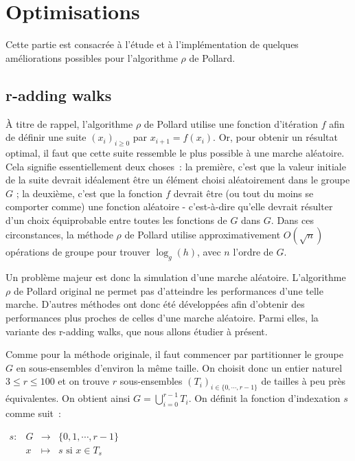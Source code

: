 \chapter{Optimisations}
	Cette partie est consacrée à l'étude et à l'implémentation de quelques améliorations possibles pour l'algorithme $\rho$ de Pollard.

		\section{r-adding walks}
    À titre de rappel, l'algorithme $\rho$ de Pollard utilise une fonction d'itération $f$ afin de définir une suite $(x_i)_{i \ge 0}$ par $x_{i+1} = f(x_i)$. Or, pour obtenir un résultat optimal, il faut que cette suite ressemble le plus possible à une marche aléatoire. Cela signifie essentiellement deux choses~: la première, c'est que la valeur initiale de la suite devrait idéalement être un élément choisi aléatoirement dans le groupe $G$ ; la deuxième, c'est que la fonction $f$ devrait être (ou tout du moins se comporter comme) une fonction aléatoire - c'est-à-dire qu'elle devrait résulter d'un choix équiprobable entre toutes les fonctions de $G$ dans $G$. Dans ces circonstances, la méthode $\rho$ de Pollard utilise approximativement $O(\sqrt{n})$ opérations de groupe pour trouver $\log_g(h)$, avec $n$ l'ordre de $G$.

		Un problème majeur est donc la simulation d'une marche aléatoire. L'algorithme $\rho$ de Pollard original ne permet pas d'atteindre les performances d'une telle marche. D'autres méthodes ont donc été développées afin d'obtenir des performances plus proches de celles d'une marche aléatoire. Parmi elles, la variante des r-adding walks, que nous allons étudier à présent.

		Comme pour la méthode originale, il faut commencer par partitionner le groupe $G$ en sous-ensembles d'environ la même taille. On choisit donc un entier naturel $3 \leq r \leq 100$ et on trouve $r$ sous-ensembles $(T_i)_{i \in \{0,\cdots,r-1\}}$ de tailles à peu près équivalentes. On obtient ainsi $G = \bigcup\limits_{i=0}^{r-1} T_i$. On définit la fonction d'indexation $s$ comme suit~:

		\begin{center}

		$\begin{array}{lrcl}
		s : & G & \longrightarrow & \{0,1,\cdots,r-1\} \\
		    & x & \longmapsto & s \text{ si } x \in T_s
		\end{array}$

		\end{center}

